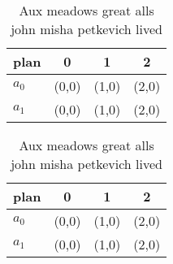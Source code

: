 \documentclass[a4paper]{article}
\begin{document}
\begin{table}
\begin{adjustbox}{width=0.6\columnwidth}
\begin{tabular}{|l|l|l|l|}
\hline
\textbf{plan} & \multicolumn{1}{c|}{\textbf{0}} & \multicolumn{1}{c|}{\textbf{1}} & \multicolumn{1}{c|}{\textbf{2}} \\ \hline
\textbf{$a_0$}  & (0,0) & (1,0) & (2,0) \\ \hline
\textbf{$a_1$}  & (0,0) & (1,0) & (2,0) \\ \hline
\end{tabular}
\end{adjustbox}
\caption{Aux meadows great alls john misha petkevich lived
}
\end{table}

\begin{table}
\begin{adjustbox}{width=0.6\columnwidth}
\begin{tabular}{|l|l|l|l|}
\hline
\textbf{plan} & \multicolumn{1}{c|}{\textbf{0}} & \multicolumn{1}{c|}{\textbf{1}} & \multicolumn{1}{c|}{\textbf{2}} \\ \hline
\textbf{$a_0$}  & (0,0) & (1,0) & (2,0) \\ \hline
\textbf{$a_1$}  & (0,0) & (1,0) & (2,0) \\ \hline
\end{tabular}
\end{adjustbox}
\caption{Aux meadows great alls john misha petkevich lived
}
\end{table}
\end{document}

